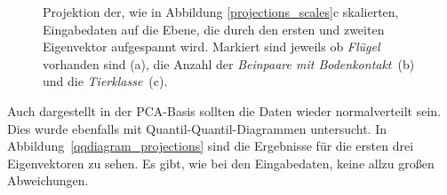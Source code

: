  \begin{figure}
  \qquad
  \qquad
  
  \caption{Projektion der, wie in Abbildung \ref{projections_scales}c skalierten, Eingabedaten auf die Ebene, die durch den ersten und zweiten Eigenvektor aufgespannt wird. Markiert sind jeweils ob \emph{Flügel} vorhanden sind (a), die Anzahl der \emph{Beinpaare mit Bodenkontakt}~(b) und die \mbox{\emph{Tierklasse} (c)}.}
  \label{projections_tags}
 \end{figure}
 
 
 Auch dargestellt in der PCA-Basis sollten die Daten wieder normalverteilt sein. Dies wurde ebenfalls mit Quantil-Quantil-Diagrammen untersucht. In \mbox{Abbildung \ref{qqdiagram_projections}} sind die Ergebnisse für die ersten drei Eigenvektoren zu sehen. Es gibt, wie bei den Eingabedaten, keine allzu großen Abweichungen.
 
